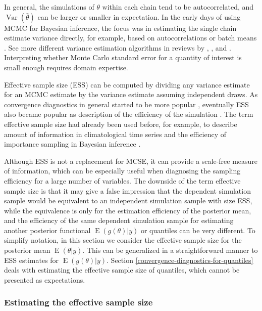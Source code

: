 \documentclass[american,]{article}
\DeclareMathOperator{\Var}{Var}
\DeclareMathOperator{\E}{E}
\theoremstyle{definition}
\begin{document}
In general, the simulations of \(\theta\) within each chain
tend to be autocorrelated, and $\Var(\bar{\theta})$ can be larger or
smaller in expectation.
%
In the early days of using MCMC for Bayesian inference, the focus was
in estimating the single chain estimate variance directly, for
example, based on autocorrelations or batch means
\citep{Hastings:1970,Geyer:1992}. See more different variance
estimation algorithms in reviews by \citet{Cowles+Carlin:1996},
\citet{Mengersen+etal:1999}, and \citet{Robert+Casella:2004}.
%
Interpreting whether Monte Carlo standard error for a quantity of
interest is small enough requires domain expertise.

Effective sample size (ESS) can be computed by dividing any variance
estimate for an MCMC estimate by the variance estimate assuming
independent draws. As convergence diagnostics in general started to be
more popular
\citep{Gelman+Rubin:1992,Cowles+Carlin:1996,Mengersen+etal:1999,Robert+Casella:2004},
eventually ESS also became popular as description of the efficiency of
the simulation \citep[an early example of reporting ESS for Gibbs
sampler is][]{Sorensen+etal:1995}. The term effective sample size had
already been used before, for example, to describe amount of
information in climatological time series \citep{Laurmann+Gates:1977}
and the efficiency of importance sampling in Bayesian inference
\citep{Kong+Liu+Wong:1994}.

Although ESS is not a replacement for MCSE, it can provide a scale-free
measure of information, which can be
especially useful when diagnosing the sampling efficiency for a large
number of variables. The downside of the term effective sample size is
that it may give a false
impression that the dependent simulation sample would be equivalent to
an independent simulation sample with size ESS, while the equivalence
is only for the estimation efficiency of the posterior mean, and the efficiency of the same
dependent simulation sample for estimating another posterior functional
\(\E\left(g(\theta) | y\right)\) or quantiles can be very
different.
%
To simplify notation, in this section we consider the effective sample
size for the posterior mean \(\E\left(\theta | y\right)\). This can be 
generalized in a straightforward manner to ESS estimates for \(\E\left(g(\theta) | y\right)\).
Section \ref{convergence-diagnostics-for-quantiles} deals with
estimating the effective sample size of quantiles, which cannot be
presented as expectations.

\subsubsection*{Estimating the effective sample size}
\end{document}
